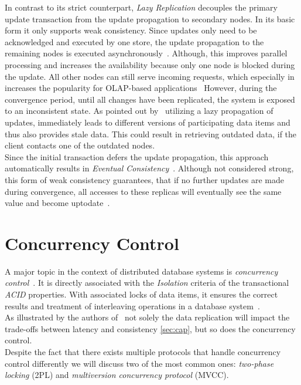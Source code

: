 In contrast to its strict counterpart, \emph{Lazy Replication} decouples the primary update transaction from the update propagation to secondary nodes.
In its basic form it only supports weak consistency. Since updates only need to be acknowledged and executed by one store, 
the update propagation to the remaining nodes is executed asynchronously~\cite{fekete:2018}.
Although, this improves parallel processing and increases the availability because only one node is blocked during the update. All other nodes can still serve incoming requests,
which especially in increases the popularity for OLAP-based applications~\cite{daudjee:2006}
However, during the convergence period, until all changes have been replicated, the system is exposed to an inconsistent state.
As pointed out by~\cite{cho:2000} utilizing a lazy propagation of updates, immediately leads to different versions of participating data items and thus also provides stale data.
This could result in retrieving outdated data, if the client contacts one of the outdated nodes.
\\
Since the initial transaction defers the update propagation, this approach automatically results in \emph{Eventual Consistency}~\cite{shapiro:2011}.
Although not considered strong, this form of weak consistency guarantees, that if no further updates are made 
during convergence, all accesses to these replicas will eventually see the same value and become uptodate~\cite{quorums:2003}.




\section{Concurrency Control}
\label{sec:concurrency_control}

A major topic in the context of distributed database systems is \emph{concurrency control}~\cite{bernstein:1981}.
It is directly associated with the \emph{Isolation} criteria of the transactional \emph{ACID} properties.
With associated locks of data items, it ensures the correct results and treatment of interleaving operations in a database system~\cite{bernstein:1986}.
\\
As illustrated by the authors of~\cite{} not solely the data replication will impact the trade-offs between latency and consistency \ref{sec:cap},
but so does the concurrency control.\\

Despite the fact that there exists multiple protocols that handle concurrency control differently we will discuss two of the most common ones: 
\emph{two-phase locking} (2PL) and \emph{multiversion concurrency protocol} (MVCC).




